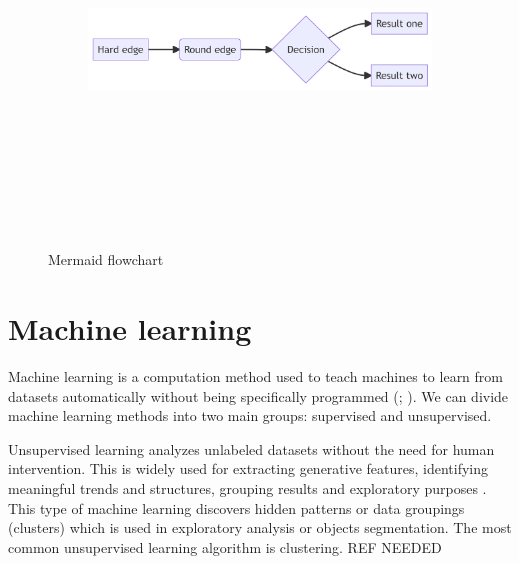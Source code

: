 \documentclass{amuthesis}
\begin{document}
\begin{figure}

{\centering 

\begin{figure}[H]

{\centering \includegraphics[width=6.3in,height=3.8in]{./03-roz3_files/figure-latex/mermaid-figure-1.png}

}

\end{figure}

}

\caption{\label{fig-rycina42}Mermaid flowchart}

\end{figure}

\hypertarget{sec-ml}{%
\section{Machine learning}\label{sec-ml}}

Machine learning is a computation method used to teach machines to learn
from datasets automatically without being specifically programmed
(\textcite{mahesh_machine_2018}; \textcite{sarker_machine_2021}). We can
divide machine learning methods into two main groups: supervised and
unsupervised.

Unsupervised learning analyzes unlabeled datasets without the need for
human intervention. This is widely used for extracting generative
features, identifying meaningful trends and structures, grouping results
and exploratory purposes \autocite{sarker_machine_2021}. This type of
machine learning discovers hidden patterns or data groupings (clusters)
which is used in exploratory analysis or objects segmentation. The most
common unsupervised learning algorithm is clustering. REF NEEDED
\end{document}
